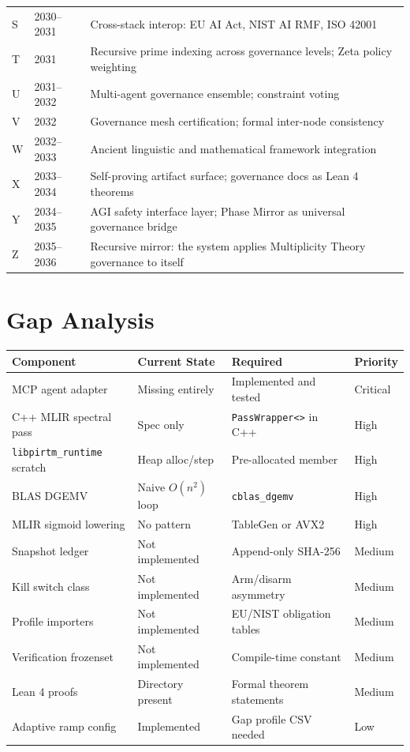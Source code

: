 \documentclass[11pt,letterpaper]{article}
\theoremstyle{remark}
\begin{document}
\begin{longtable}{llp{8.5cm}}
S & 2030--2031 & Cross-stack interop: EU AI Act, NIST AI RMF, ISO 42001 \\
T & 2031 & Recursive prime indexing across governance levels; Zeta policy weighting \\
U & 2031--2032 & Multi-agent governance ensemble; constraint voting \\
V & 2032 & Governance mesh certification; formal inter-node consistency \\
W & 2032--2033 & Ancient linguistic and mathematical framework integration \\
X & 2033--2034 & Self-proving artifact surface; governance docs as Lean 4 theorems \\
Y & 2034--2035 & AGI safety interface layer; Phase Mirror as universal governance bridge \\
Z & 2035--2036 & Recursive mirror: the system applies Multiplicity Theory governance to itself \\
\bottomrule
\end{longtable}

\section{Gap Analysis}

\begin{longtable}{p{4cm}p{3.5cm}p{3.5cm}l}
\toprule
\textbf{Component} & \textbf{Current State} & \textbf{Required} & \textbf{Priority} \\
\midrule
\endhead
MCP agent adapter & Missing entirely & Implemented and tested & Critical \\
C++ MLIR spectral pass & Spec only & \texttt{PassWrapper<>} in C++ & High \\
\texttt{libpirtm\_runtime} scratch & Heap alloc/step & Pre-allocated member & High \\
BLAS DGEMV & Naive $O(n^2)$ loop & \texttt{cblas\_dgemv} & High \\
MLIR sigmoid lowering & No pattern & TableGen or AVX2 & High \\
Snapshot ledger & Not implemented & Append-only SHA-256 & Medium \\
Kill switch class & Not implemented & Arm/disarm asymmetry & Medium \\
Profile importers & Not implemented & EU/NIST obligation tables & Medium \\
Verification frozenset & Not implemented & Compile-time constant & Medium \\
Lean 4 proofs & Directory present & Formal theorem statements & Medium \\
Adaptive ramp config & Implemented & Gap profile CSV needed & Low \\
\bottomrule
\end{longtable}
\end{document}
